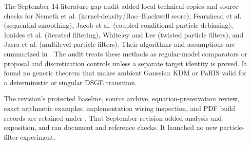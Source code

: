 \documentclass[11pt]{article}
\begin{document}
The September 14 literature-gap audit added local technical copies and source
checks for Nemeth et al. (kernel-density/Rao--Blackwell score), Fearnhead et
al. (sequential smoothing), Jacob et al. (coupled conditional-particle
debiasing), Ionides et al. (iterated filtering), Whiteley and Lee (twisted
particle filters), and Jasra et al. (multilevel particle filters). Their
algorithms and assumptions are summarized in
.
The audit treats these methods as regular-model comparators or proposal and
discretization controls unless a separate target identity is proved. It found
no generic theorem that makes ambient Gaussian KDM or PaRIS valid for a
deterministic or singular DSGE transition.

The revision's protected baseline, source archive, equation-preservation
review, exact arithmetic examples, implementation wiring inspection, and
PDF build records are retained under
.
That September revision added analysis and exposition, and ran document and
reference checks. It launched no new particle-filter experiment.


\clearpage


\end{document}
